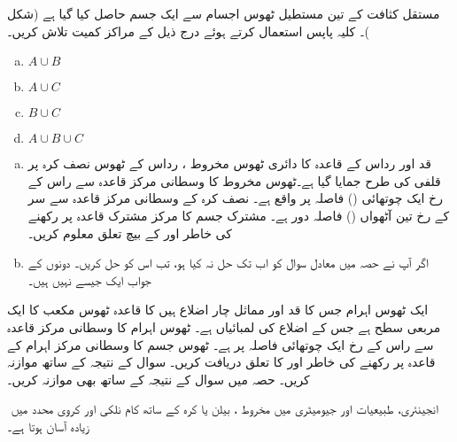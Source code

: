 مستقل کثافت  کے تین مستطیل ٹھوس اجسام سے ایک جسم حاصل کیا گیا ہے (شکل )۔ کلیہ پاپس استعمال کرتے ہوئے درج  ذیل کے مراکز کمیت تلاش کریں۔
\begin{multicols}{4}
\begin{enumerate}[a.]
\item
$A\cup B$
\item
$A\cup C$
\item
$B\cup C$
\item
$A\cup B\cup C$
\end{enumerate}
\end{multicols}
\begin{enumerate}[a.]
\item
 قد  اور رداس  کے قاعدہ کا  دائری ٹھوس  مخروط ، رداس  کے    ٹھوس  نصف کرہ   پر قلفی کی طرح جمایا گیا ہے۔ٹھوس مخروط کا وسطانی مرکز قاعدہ سے راس کے رخ  ایک 
چوتھائی ()  فاصلہ پر واقع ہے۔ نصف کرہ کے وسطانی مرکز قاعدہ سے سر کے رخ  تین آٹھواں ()  فاصلہ دور ہے۔ مشترک جسم  کا مرکز مشترک قاعدہ پر رکھنے کی خاطر  اور  کے بیچ تعلق معلوم کریں۔ 
\item
اگر آپ نے حصہ  میں معادل    سوال  کو اب تک حل نہ کیا ہو، تب اس کو حل کریں۔ دونوں کے جواب ایک جیسے نہیں ہیں۔
\end{enumerate}
ایک ٹھوس اہرام    جس کا  قد    اور مماثل چار اضلاع ہیں کا قاعدہ ٹھوس    مکعب    کا ایک مربعی  سطح ہے جس کے اضلاع کی  لمبائیاں  ہے۔  ٹھوس اہرام کا وسطانی مرکز قاعدہ سے راس کے رخ ایک چوتھائی فاصلہ پر ہے۔ ٹھوس جسم  کا وسطانی مرکز اہرام کے قاعدہ پر رکھنے کی خاطر  اور  کا تعلق دریافت کریں۔ سوال  کے نتیجہ کے ساتھ موازنہ کریں۔ حصہ  میں سوال  کے نتیجہ کے ساتھ بھی موازنہ کریں۔

﻿
انجینئری،  طبیعیات اور جیومیٹری میں  مخروط ، بیلن یا کرہ کے ساتھ کام  نلکی اور کروی محدد میں زیادہ آسان ہوتا ہے۔


